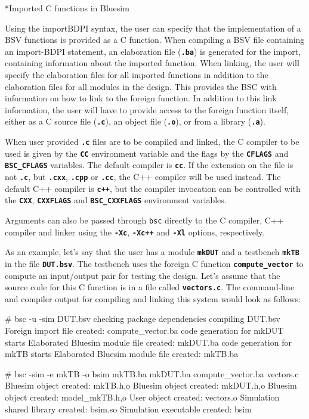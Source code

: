 \documentclass{article}
\makeatletter
\newenvironment{centerboxverbatim}
  {\center
   \boxedverbatim}
  {\endboxedverbatim
  {\endcenter }}
\def\subsubsubsection{\@startsection {subsubsubsection}{4}{\z@}{-3ex plus -1ex minus -.2ex}{1.25ex plus .2ex}{\normalsize\bf}*}
\makeatother
\begin{document}

\subsubsubsection{Imported C functions in Bluesim}
\label{importC-bluesim}

Using the importBDPI syntax, the user can specify that the
implementation of a BSV functions is provided as a C function.
When compiling a BSV file
containing an import-BDPI statement, an elaboration file ({\bf\tt .ba}) is
generated for the import, containing information about the imported
function.  When linking, the user will specify the elaboration files
for all  imported functions in addition to the
elaboration files for all modules in the design.
This provides the BSC with  information  on
how to  link
to the foreign function.  In addition to this link information, the
user will have to provide access to the foreign function itself,
either as a C source file ({\bf\tt .c}), an object file ({\bf\tt .o}), or from
a library ({\bf\tt .a}).

When user provided {\bf\tt .c} files are to
be compiled and linked, the C compiler to be used is given by the
{\bf\tt CC} environment variable and the flags by the {\bf\tt CFLAGS}
and {\bf\tt BSC\_CFLAGS} variables.
The default compiler is {\bf\tt cc}.  If the extension on
the file is not {\bf\tt .c}, but {\bf\tt .cxx}, {\bf\tt .cpp} or
{\bf\tt .cc}, the C++ compiler will be used instead.
The default C++ compiler is {\bf\tt c++}, but the
compiler invocation can be controlled with the {\bf\tt CXX},
{\bf\tt CXXFLAGS} and {\bf\tt BSC\_CXXFLAGS} environment variables.

Arguments can also be passed through {\tt bsc} directly to the C
compiler, C++ compiler and linker using the {\tt\bf -Xc},
 {\tt\bf -Xc++} and {\tt\bf -Xl} options, respectively.

As an example, let's say that the user has a module {\bf\tt mkDUT}
and a testbench {\bf\tt mkTB} in the file {\bf\tt DUT.bsv}.  The testbench
uses the foreign C function {\bf\tt compute\_vector} to compute an
input/output pair for testing the design.  Let's assume that the
source code for this C function is in a file called {\bf\tt vectors.c}.
The command-line and compiler output for compiling and linking this system
would look as follows:

\begin{centerboxverbatim}
# bsc -u -sim DUT.bsv
checking package dependencies
compiling DUT.bsv
Foreign import file created: compute_vector.ba
code generation for mkDUT starts
Elaborated Bluesim module file created: mkDUT.ba
code generation for mkTB starts
Elaborated Bluesim module file created: mkTB.ba

# bsc -sim -e mkTB -o bsim mkTB.ba mkDUT.ba compute_vector.ba vectors.c
Bluesim object created: mkTB.{h,o}
Bluesim object created: mkDUT.{h,o}
Bluesim object created: model_mkTB.{h,o}
User object created: vectors.o
Simulation shared library created: bsim.so
Simulation executable created: bsim
\end{centerboxverbatim}
\end{document}
